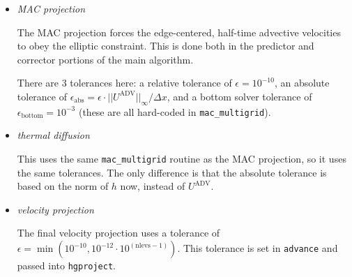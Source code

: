 \begin{itemize}

\item {\em MAC projection}  

  The MAC projection forces the edge-centered, half-time advective
  velocities to obey the elliptic constraint.  This is done both in
  the predictor and corrector portions of the main algorithm.

  There are 3 tolerances here: a relative tolerance of $\epsilon =
  10^{-10}$, an absolute tolerance of $\epsilon_\mathrm{abs} =
  \epsilon \cdot ||U^\mathrm{ADV}||_\infty / \Delta x$, and a bottom
  solver tolerance of $\epsilon_\mathrm{bottom} = 10^{-3}$ (these are
  all hard-coded in {\tt mac\_multigrid}).


\item {\em thermal diffusion}

  This uses the same {\tt mac\_multigrid} routine as the MAC
  projection, so it uses the same tolerances.  The only difference is
  that the absolute tolerance is based on the norm of $h$ now, instead
  of $U^\mathrm{ADV}$.

\item {\em velocity projection}

  The final velocity projection uses a tolerance of $\epsilon = \min(
  10^{-10}, 10^{-12} \cdot 10^{(\mathrm{nlevs} - 1)} )$.  This tolerance
  is set in {\tt advance} and passed into {\tt hgproject}.

\end{itemize}

